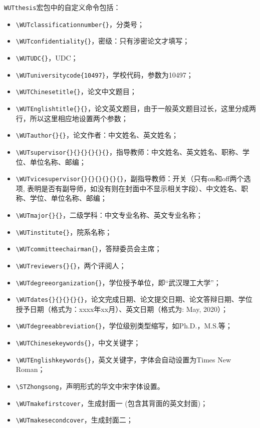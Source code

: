 \par \texttt{WUTthesis}宏包中的自定义命令包括：
\begin{itemize}
\item \verb"\WUTclassificationnumber{}"，分类号；
\item \verb"\WUTconfidentiality{}"，密级：只有涉密论文才填写；
\item \verb"\WUTUDC{}"，UDC；
\item \verb"\WUTuniversitycode{10497}"，学校代码，参数为10497；
\item \verb"\WUTChinesetitle{}"，论文中文题目；
\item \verb"\WUTEnglishtitle{}{}"，论文英文题目，由于一般英文题目过长，这里分成两行，所以这里相应地设置两个参数；
\item \verb"\WUTauthor{}{}"，论文作者：中文姓名、英文姓名；
\item \verb"\WUTsupervisor{}{}{}{}{}{}"，指导教师：中文姓名、英文姓名、职称、学位、单位名称、邮编；
\item \verb"\WUTvicesupervisor{}{}{}{}{}{}"，副指导教师：开关（只有on和off两个选项, 表明是否有副导师，如没有则在封面中不显示相关字段）、中文姓名、职称、学位、单位名称、邮编；
\item \verb"\WUTmajor{}{}"，二级学科：中文专业名称、英文专业名称；
\item \verb"\WUTinstitute{}"，院系名称；
\item \verb"\WUTcommitteechairman{}"，答辩委员会主席；
\item \verb"\WUTreviewers{}{}"，两个评阅人；
\item \verb"\WUTdegreeorganization{}"，学位授予单位，即“武汉理工大学”；
\item \verb"\WUTdates{}{}{}{}{}"，论文完成日期、论文提交日期、论文答辩日期、学位授予日期（格式为：xxxx年xx月）、英文日期（格式为: May, 2020）；
\item \verb"\WUTdegreeabbreviation{}"，学位级别类型缩写，如Ph.D.，M.S.等；
\item \verb"\WUTChinesekeywords{}"，中文关键字；
\item \verb"\WUTEnglishkeywords{}"，英文关键字，字体会自动设置为{\selectfont Times New Roman}；
\item \verb"\STZhongsong"，声明形式的华文中宋字体设置。
\item \verb"\WUTmakefirstcover"，生成封面一 (包含其背面的英文封面)；
\item \verb"\WUTmakesecondcover"，生成封面二；
\end{itemize}





